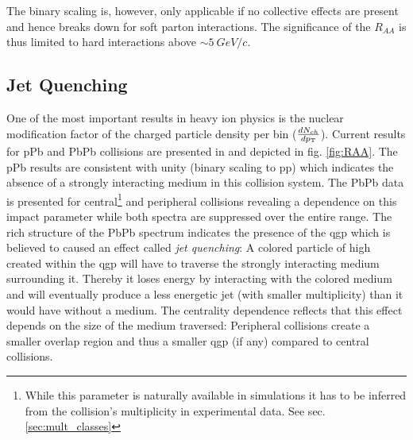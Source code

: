 The binary scaling is, however, only applicable if no collective effects are present and hence breaks down for soft parton interactions. The significance of the $R_{AA}$ is thus limited to hard interactions above $\sim \SI{5}{GeV/c}$.

\subsection{ Jet Quenching}
\label{sec:jet-quenching}

One of the most important results in heavy ion physics is the nuclear modification factor of the charged particle density per \pt bin ($\frac{dN_{ch}}{dp_{\text{T}}}$). Current results for \gls{pPb} and \gls{PbPb} collisions are presented in \cite{Abelev2013} and depicted in fig. \ref{fig:RAA}. The \gls{pPb} results are consistent with unity (binary scaling to \gls{pp}) which indicates the absence of a strongly interacting medium in this collision system. The \gls{PbPb} data is presented for central\footnote{While this parameter is naturally available in simulations it has to be inferred from the collision's multiplicity in experimental data. See sec. \ref{sec:mult_classes}} and peripheral collisions revealing a dependence on this impact parameter while both spectra are suppressed over the entire \pt range. The rich structure of the \gls{PbPb} spectrum indicates the presence of the \gls{qgp} which is believed to caused an effect called \emph{jet quenching}: A colored particle of high \pt created within the \gls{qgp} will have to traverse the strongly interacting medium surrounding it. Thereby it loses energy by interacting with the colored medium and will eventually produce a less energetic jet (with smaller multiplicity) than it would have without a medium. The centrality dependence reflects that this effect depends on the size of the medium traversed: Peripheral collisions create a smaller overlap region and thus a smaller \gls{qgp} (if any) compared to central collisions.

